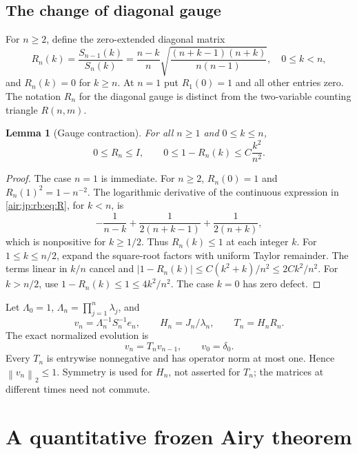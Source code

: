 \documentclass[11pt,letterpaper]{article}
\numberwithin{equation}{section}
\newtheorem{lemma}[theorem]{Lemma}
\theoremstyle{remark}
\newcommand{\norm}[1]{\left\lVert#1\right\rVert}
\begin{document}
\subsection{The change of diagonal gauge}
For $n\ge2$, define the zero-extended diagonal matrix
\begin{equation}\label{air:jp:rb:eq:R}
 R_n(k)=\frac{S_{n-1}(k)}{S_n(k)}
 =\frac{n-k}{n}\sqrt{\frac{(n+k-1)(n+k)}{n(n-1)}},\quad 0\le k<n,
\end{equation}
and $R_n(k)=0$ for $k\ge n$. At $n=1$ put $R_1(0)=1$ and all other entries zero. The notation $R_n$ for the diagonal gauge is distinct from the two-variable counting triangle $R(n,m)$.

\begin{lemma}[Gauge contraction]\label{air:jp:rb:lem:gauge}
For all $n\ge1$ and $0\le k\le n$,
\begin{equation}\label{air:jp:rb:eq:gauge}
 0\le R_n\le I,\qquad 0\le1-R_n(k)\le C\frac{k^2}{n^2}.
\end{equation}
\end{lemma}
\begin{proof}
The case $n=1$ is immediate. For $n\ge2$, $R_n(0)=1$ and $R_n(1)^2=1-n^{-2}$. The logarithmic derivative of the continuous expression in \eqref{air:jp:rb:eq:R}, for $k<n$, is
\[
 -\frac1{n-k}+\frac1{2(n+k-1)}+\frac1{2(n+k)},
\]
which is nonpositive for $k\ge1/2$. Thus $R_n(k)\le1$ at each integer $k$. For $1\le k\le n/2$, expand the square-root factors with uniform Taylor remainder. The terms linear in $k/n$ cancel and
$|1-R_n(k)|\le C(k^2+k)/n^2\le2Ck^2/n^2$.
For $k>n/2$, use $1-R_n(k)\le1\le4k^2/n^2$. The case $k=0$ has zero defect.
\end{proof}

Let $\Lambda_0=1$, $\Lambda_n=\prod_{j=1}^n\lambda_j$, and
\begin{equation}\label{air:jp:rb:eq:v}
 v_n=\Lambda_n^{-1}S_n^{-1}e_n,\qquad
 H_n=J_n/\lambda_n,\qquad T_n=H_nR_n.
\end{equation}
The exact normalized evolution is
\begin{equation}\label{air:jp:rb:eq:product}
 v_n=T_nv_{n-1},\qquad v_0=\delta_0.
\end{equation}
Every $T_n$ is entrywise nonnegative and has operator norm at most one. Hence $\norm{v_n}_2\le1$. Symmetry is used for $H_n$, not asserted for $T_n$; the matrices at different times need not commute.

\section{A quantitative frozen Airy theorem}\label{air:jp:rb:sec:airy}
\end{document}
